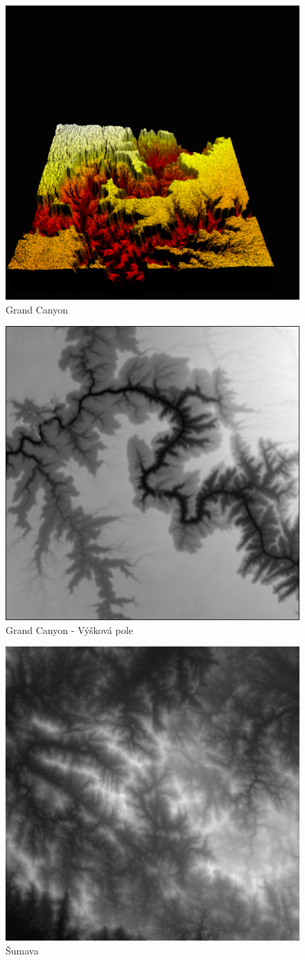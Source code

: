 \documentclass[report,11pt]{elsarticle}
\begin{document}
\begin{figure}[h]
\hfill\includegraphics[width=0.6\linewidth]{grand_canyon.png}\hspace*{\fill}
\caption{Grand Canyon}
\label{fig:gc}
\end{figure}

\begin{figure}[h]
\hfill\includegraphics[width=0.5\linewidth]{grand_canyon.jpg}\hspace*{\fill}
\caption{Grand Canyon - Výšková pole}
\label{fig:gcHm}
\end{figure}

\begin{figure}[h]
\hfill\includegraphics[width=0.6\linewidth]{sumava.png}\hspace*{\fill}
\caption{Šumava}
\label{fig:sum}
\end{figure}
\end{document}
